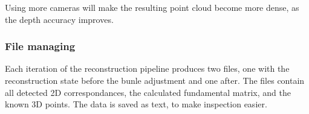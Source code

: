 Using more cameras will make the resulting point cloud become more dense, as the depth accuracy improves.

\subsubsection{File managing}
Each iteration of the reconstruction pipeline produces two files, one with the reconstruction state before the bunle adjustment and one after. The files contain all detected 2D correspondances, the calculated fundamental matrix, and the known 3D points. The data is saved as text, to make inspection easier.